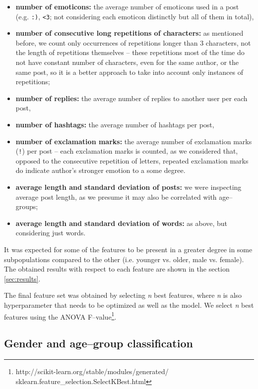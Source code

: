 \documentclass[10pt, a4paper]{article}
\begin{document}
\begin{itemize}
	\item \textbf{number of emoticons:} the average number of emoticons used in a post (e.g. \verb|:)|, \verb|<3|; not considering each emoticon distinctly but all of them in total),
	\item \textbf{number of consecutive long repetitions of characters:} as mentioned before, we count only occurrences of repetitions longer than 3 characters, not the length of repetitions themselves -- these repetitions most of the time do not have constant number of characters, even for the same author, or the same post, so it is a better approach to take into account only instances of repetitions;
	\item \textbf{number of replies:} the average number of replies to another user per each post,
	\item \textbf{number of hashtags:} the average number of hashtags per post,
	\item \textbf{number of exclamation marks:} the average number of exclamation marks (\verb|!|) per post -- each exclamation marks is counted, as we considered that, opposed to the consecutive repetition of letters, repeated exclamation marks do indicate author's stronger emotion to a some degree.
	\item \textbf{average length and standard deviation of posts:} we were inspecting average post length, as we presume it may also be correlated with age--groups;
	\item \textbf{average length and standard deviation of words:} as above, but considering just words.
\end{itemize}

It was expected for some of the features to be present in a greater degree in some subpopulations compared to the other (i.e. younger vs. older, male vs. female).
The obtained results with respect to each feature are shown in the section \ref{sec:results}.

The final feature set was obtained by selecting \textit{n} best features, where \textit{n} is also hyperparameter that needs to be optimized as well as the model.
We select \textit{n} best features using the ANOVA F--value\footnote{http://scikit-learn.org/stable/modules/generated/
	sklearn.feature\_selection.SelectKBest.html}.

\subsection{Gender and age--group classification}
\end{document}
